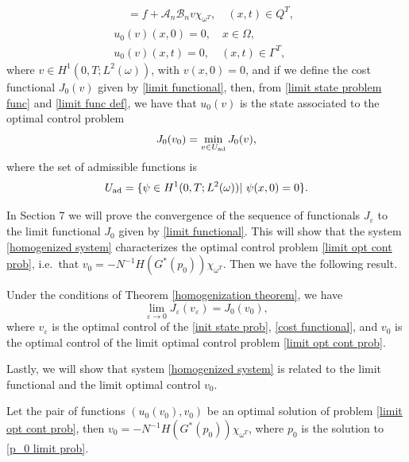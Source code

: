 \documentclass[reqno]{amsart}
\begin{document}
\begin{theorem}
\begin{equation}
\begin{gathered}
\begin{aligned}
&=f+\mathcal{A}_n\mathcal{B}_nv\chi _{\omega ^{T}}, \quad (x,t)\in Q^{T},
\end{aligned} \\
u_0(v)(x,0)=0, \quad x\in \Omega , \\
u_0(v)(x,t)=0, \quad (x,t)\in \Gamma ^{T},%
\end{gathered}   \label{limit state problem func}
\end{equation}
where $v\in H^{1}(0,T;L^2(\omega ))$, with $v(x,0)=0$, and if we define
the cost functional $J_0(v)$ given by \eqref{limit functional}, then,
from \eqref{limit state problem func} and \eqref{limit func def}, we have
that $u_0(v)$ is the state associated to the optimal control problem
\begin{equation}
J_0(v_0)=\min _{v\in U_{\rm ad}}J_0(v),  \label{limit opt cont prob}
\end{equation}
where the set of admissible functions is
\[
U_{\rm ad}=\{ \psi \in H^{1}(0,T;L^2(\omega ))|\text{ }\psi (x,0)=0\}.
\]
\end{theorem}

In Section 7 we will prove the convergence of the sequence of functionals 
$J_{\varepsilon }$ to the limit functional $J_0$ given by \eqref{limit functional}. 
This will show that the system \eqref{homogenized system} characterizes the optimal 
control problem \eqref{limit opt cont prob}, i.e.\
that $v_0=-N^{-1}H(G^{\ast }(p_0))\chi _{\omega ^{T}}$. 
Then we have the following result.

\begin{theorem}
\label{thm: cost func limit} 
Under the conditions of Theorem \ref{homogenization theorem}, we have
\[
\lim _{\varepsilon \to 0}J_{\varepsilon }(v_{\varepsilon
})=J_0(v_0),
\]%
where $v_{\varepsilon }$ is the optimal control of the
\eqref{init state prob}, \eqref{cost functional}, and $v_0$ is the optimal control
of the limit optimal control problem \eqref{limit opt cont prob}.
\end{theorem}

 Lastly, we will show that  system \eqref{homogenized system} is
related to the limit functional and the limit optimal control $v_0$.

\begin{theorem}
\label{Thm convergence controls}
Let the pair of functions $(u_0(v_0),v_0)$ be an optimal solution of 
problem \eqref{limit opt cont prob}, then 
$v_0=-N^{-1}H(G^{\ast }(p_0))\chi _{\omega ^{T}}$,
where $p_0$ is the solution to \eqref{p_0 limit prob}.
\end{theorem}
\end{document}

